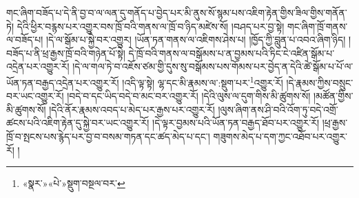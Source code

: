 གང་ཞིག་བཟོད་པ་དེ་ནི་བྱ་བ་ལ་ལན་དུ་གནོད་པ་བྱེད་པར་མི་ནུས་སོ་སྙམ་པས་འཇིག་རྟེན་གྱིས་ཟིལ་གྱིས་གནོན་ཏེ། དེའི་ཕྱིར་བརྙས་པར་འགྱུར་བས་ཁྲོ་བའི་གནས་ལ་ཁྲོ་བ་ཉིད་མཛེས་སོ། །བཤད་པར་བྱ་སྟེ། གང་ཞིག་ཁྲོ་གནས་ལ་བཟོད་པ། །དེ་ལ་སྒོམ་པ་སྐྱེ་བར་འགྱུར། །ཡོན་ཏན་གནས་ལ་འཇིགས་ཤེས་པ། །ཁྱོད་ཀྱི་བླུན་པ་འབའ་ཞིག་ཉིད། །བཟོད་པ་ནི་ཕྲ་རྒྱས་ཁྲོ་བའི་གཉེན་པོ་སྟེ། དེ་ཁྲོ་བའི་གནས་ལ་བསྒོམས་པ་ན་བྱམས་པའི་ཏིང་ངེ་འཛིན་སྒོམ་པ་འདྲེན་པར་འགྱུར་རོ། །དེ་ལ་གལ་ཏེ་བ་འཇོས་ཙམ་གྱི་དུས་སུ་བསྒོམས་པས་གོམས་པར་བྱེད་ན་དེའི་ཚེ་སྒོམ་པ་པོ་ལ་ཡོན་ཏན་བརྒྱད་འདྲེན་པར་འགྱུར་རོ། །འདི་ལྟ་སྟེ། ལྷ་དང་མི་རྣམས་ལ་:སྡུག་པར་\footnote{«སྣར་»«པེ་»སྡུག་བསྔལ་བར་}འགྱུར་རོ། །དེ་རྣམས་ཀྱིས་བསྲུང་བར་ཡང་འགྱུར་རོ། །བདེ་བ་དང་ཡིད་བདེ་བ་མང་བར་འགྱུར་རོ། །དེའི་ལུས་ལ་དུག་གིས་མི་ཚུགས་སོ། །མཚོན་གྱིས་མི་ཚུགས་སོ། །དེའི་ནོར་རྣམས་འབད་པ་མེད་པར་རྒྱས་པར་འགྱུར་རོ། །ལུས་ཞིག་ནས་ཤི་བའི་འོག་ཏུ་བདེ་འགྲོ་ཚངས་པའི་འཇིག་རྟེན་དུ་སྐྱེ་བར་ཡང་འགྱུར་རོ། །དེ་ལྟར་བྱམས་པའི་ཡོན་ཏན་བརྒྱད་ཐོབ་པར་འགྱུར་རོ། །ཕྲ་རྒྱས་ཁྲོ་བ་སྤངས་པས་རྙེད་པར་བྱ་བ་བསམ་གཏན་དང་ཚད་མེད་པ་དང་། གཟུགས་མེད་པ་དག་ཀྱང་འཐོབ་པར་འགྱུར་རོ། །
